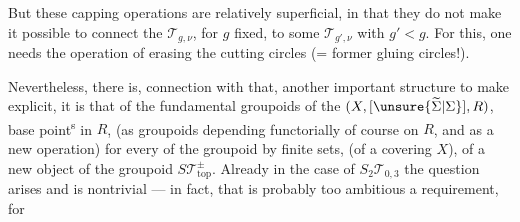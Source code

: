 But these capping operations are relatively superficial, in that they do not make it possible to connect the $\mathcal T_{g,\nu}$, for $g$ fixed, to some $\mathcal T_{g',\nu}$ with $g'<g$. For this, one needs the operation  of erasing the cutting circles (= former gluing circles!).

Nevertheless, there is,   connection with that, another important structure to make explicit, it is that of the  fundamental groupoids  of the $(X,[\unsure{\widetilde{\Sigma}|\Sigma}],R)$, base point\textsuperscript{s} in $R$,  (as groupoids depending functorially of course on $R$, and  as a new operation) for every   of the groupoid by finite sets, \inserted{[\unsure{defining|definition} \unsure{a|of the}} (of a covering   $X$), of a new object of the  groupoid $S\mathcal T_{\mathrm{top}}^\pm$. Already in the case of $S_2\mathcal T_{0,3}$ the question arises and is nontrivial --- in fact, that is probably too ambitious a requirement, for

